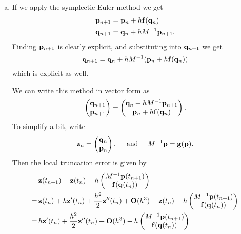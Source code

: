\FloatBarrier

\begin{solution}
  \begin{enumerate}[(a)]
    \item If we apply the symplectic Euler method we get
    \begin{align*}
      \mathbf{p}_{n+1} &= \mathbf{p}_n + h \mathbf{f}(\mathbf{q}_n) \\
      \mathbf{q}_{n+1} &= \mathbf{q}_n + h M^{-1} \mathbf{p}_{n+1}.
    \end{align*}
    Finding $\mathbf{p}_{n+1}$ is clearly explicit, and substituting into $\mathbf{q}_{n+1}$ we get
    \[
      \mathbf{q}_{n+1} = \mathbf{q}_n + h M^{-1}(\mathbf{p}_n + h \mathbf{f}(\mathbf{q}_n))
    \]
    which is explicit as well.
  
    We can write this method in vector form as 
    \[
      \begin{pmatrix}
        \mathbf{q}_{n+1} \\ \mathbf{p}_{n+1}
      \end{pmatrix}
      =
      \begin{pmatrix}
        \mathbf{q}_n + h M^{-1} \mathbf{p}_{n+1} \\
        \mathbf{p}_n + h \mathbf{f}(\mathbf{q}_n)
      \end{pmatrix}.
    \]
    To simplify a bit, write
    \[
      \mathbf{z}_n = 
      \begin{pmatrix}
        \mathbf{q}_n \\ \mathbf{p}_n
      \end{pmatrix},
      \quad\text{ and }\quad 
      M^{-1} \mathbf{p} = \mathbf{g}(\mathbf{p}).
    \]
    Then the local truncation error is given by
    \begin{align*}
      &\mathbf{z}(t_{n+1}) - \mathbf{z}(t_n) - h
      \begin{pmatrix}
        M^{-1}\mathbf{p}(t_{n+1}) \\
        \mathbf{f}(\mathbf{q}(t_n))
      \end{pmatrix} \\
      =\, & \mathbf{z}(t_n) + h\mathbf{z}'(t_n) + \frac{h^2}{2}\mathbf{z}''(t_n) + \mathbf{O}(h^3) - \mathbf{z}(t_n) - h
      \begin{pmatrix}
        M^{-1}\mathbf{p}(t_{n+1}) \\
        \mathbf{f}(\mathbf{q}(t_n))
      \end{pmatrix} \\
      =\, & h \mathbf{z}'(t_n) + \frac{h^2}{2}\mathbf{z}''(t_n) + \mathbf{O}(h^3) - h
      \begin{pmatrix}
        M^{-1}\mathbf{p}(t_{n+1}) \\
        \mathbf{f}(\mathbf{q}(t_n))

\end{pmatrix}
\end{align*}
\end{enumerate}
\end{solution}

